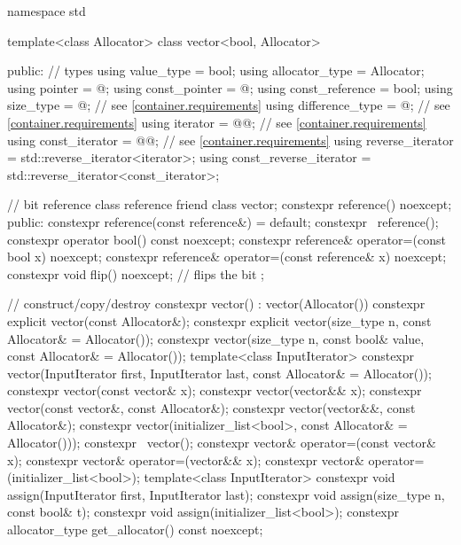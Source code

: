 \begin{codeblock}
namespace std {
  template<class Allocator>
  class vector<bool, Allocator> {
  public:
    // types
    using value_type             = bool;
    using allocator_type         = Allocator;
    using pointer                = @\impdef@;
    using const_pointer          = @\impdef@;
    using const_reference        = bool;
    using size_type              = @\impdef@; // see \ref{container.requirements}
    using difference_type        = @\impdef@; // see \ref{container.requirements}
    using iterator               = @@; // see \ref{container.requirements}
    using const_iterator         = @@; // see \ref{container.requirements}
    using reverse_iterator       = std::reverse_iterator<iterator>;
    using const_reverse_iterator = std::reverse_iterator<const_iterator>;

    // bit reference
    class reference {
      friend class vector;
      constexpr reference() noexcept;
    public:
      constexpr reference(const reference&) = default;
      constexpr ~reference();
      constexpr operator bool() const noexcept;
      constexpr reference& operator=(const bool x) noexcept;
      constexpr reference& operator=(const reference& x) noexcept;
      constexpr void flip() noexcept;   // flips the bit
    };

    // construct/copy/destroy
    constexpr vector() : vector(Allocator()) { }
    constexpr explicit vector(const Allocator&);
    constexpr explicit vector(size_type n, const Allocator& = Allocator());
    constexpr vector(size_type n, const bool& value, const Allocator& = Allocator());
    template<class InputIterator>
      constexpr vector(InputIterator first, InputIterator last, const Allocator& = Allocator());
    constexpr vector(const vector& x);
    constexpr vector(vector&& x);
    constexpr vector(const vector&, const Allocator&);
    constexpr vector(vector&&, const Allocator&);
    constexpr vector(initializer_list<bool>, const Allocator& = Allocator()));
    constexpr ~vector();
    constexpr vector& operator=(const vector& x);
    constexpr vector& operator=(vector&& x);
    constexpr vector& operator=(initializer_list<bool>);
    template<class InputIterator>
      constexpr void assign(InputIterator first, InputIterator last);
    constexpr void assign(size_type n, const bool& t);
    constexpr void assign(initializer_list<bool>);
    constexpr allocator_type get_allocator() const noexcept;

}}
\end{codeblock}
